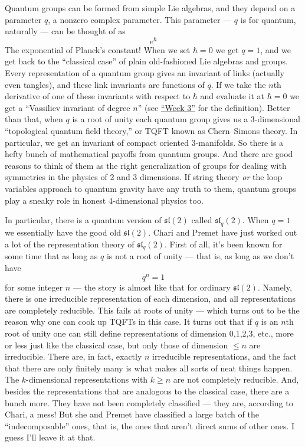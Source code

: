\documentclass[12pt]{article}
\begin{document}
Quantum groups can be formed from simple Lie algebras, and they depend
on a parameter \(q\), a nonzero complex parameter. This parameter ---
\(q\) is for quantum, naturally --- can be thought of as \[e^\hbar\] The
exponential of Planck's constant! When we set \(\hbar = 0\) we get
\(q = 1\), and we get back to the ``classical case'' of plain
old-fashioned Lie algebras and groups. Every representation of a quantum
group gives an invariant of links (actually even tangles), and these
link invariants are functions of \(q\). If we take the \(n\)th
derivative of one of these invariants with respect to \(\hbar\) and
evaluate it at \(\hbar = 0\) we get a ``Vassiliev invariant of degree
\(n\)'' (see \protect\hyperlink{week3}{``Week 3''} for the definition).
Better than that, when \(q\) is a root of unity each quantum group gives
us a \(3\)-dimensional ``topological quantum field theory,'' or TQFT
known as Chern--Simons theory. In particular, we get an invariant of
compact oriented 3-manifolds. So there is a hefty bunch of mathematical
payoffs from quantum groups. And there are good reasons to think of them
as the right generalization of groups for dealing with symmetries in the
physics of 2 and 3 dimensions. If string theory \emph{or} the loop
variables approach to quantum gravity have any truth to them, quantum
groups play a sneaky role in honest \(4\)-dimensional physics too.

In particular, there is a quantum version of \(\mathfrak{sl}(2)\) called
\(\mathfrak{sl}_q(2)\). When \(q = 1\) we essentially have the good old
\(\mathfrak{sl}(2)\). Chari and Premet have just worked out a lot of the
representation theory of \(\mathfrak{sl}_q(2)\). First of all, it's been
known for some time that as long as \(q\) is not a root of unity ---
that is, as long as we don't have \[q^n = 1\] for some integer \(n\) ---
the story is almost like that for ordinary \(\mathfrak{sl}(2)\). Namely,
there is one irreducible representation of each dimension, and all
representations are completely reducible. This fails at roots of unity
--- which turns out to be the reason why one can cook up TQFTs in this
case. It turns out that if \(q\) is an \(n\)th root of unity one can
still define representations of dimension 0,1,2,3, etc., more or less
just like the classical case, but only those of dimension
\(\leqslant n\) are irreducible. There are, in fact, exactly \(n\)
irreducible representations, and the fact that there are only finitely
many is what makes all sorts of neat things happen. The
\(k\)-dimensional representations with \(k \geqslant n\) are not
completely reducible. And, besides the representations that are
analogous to the classical case, there are a bunch more. They have not
been completely classified --- they are, according to Chari, a mess! But
she and Premet have classified a large batch of the ``indecomposable''
ones, that is, the ones that aren't direct sums of other ones. I guess
I'll leave it at that.
\end{document}
